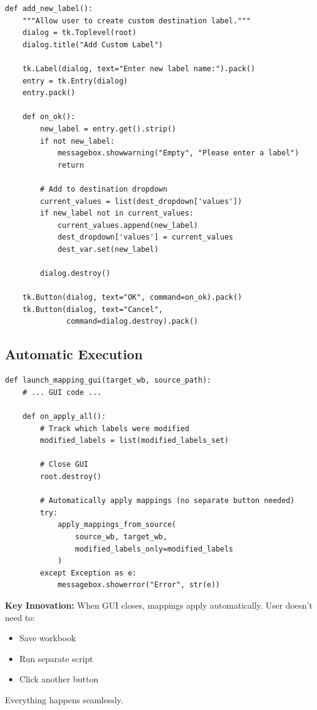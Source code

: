 \begin{lstlisting}[style=pythonstyle]
def add_new_label():
    """Allow user to create custom destination label."""
    dialog = tk.Toplevel(root)
    dialog.title("Add Custom Label")
    
    tk.Label(dialog, text="Enter new label name:").pack()
    entry = tk.Entry(dialog)
    entry.pack()
    
    def on_ok():
        new_label = entry.get().strip()
        if not new_label:
            messagebox.showwarning("Empty", "Please enter a label")
            return
        
        # Add to destination dropdown
        current_values = list(dest_dropdown['values'])
        if new_label not in current_values:
            current_values.append(new_label)
            dest_dropdown['values'] = current_values
            dest_var.set(new_label)
        
        dialog.destroy()
    
    tk.Button(dialog, text="OK", command=on_ok).pack()
    tk.Button(dialog, text="Cancel", 
              command=dialog.destroy).pack()
\end{lstlisting}

\subsection{Automatic Execution}

\begin{lstlisting}[style=pythonstyle]
def launch_mapping_gui(target_wb, source_path):
    # ... GUI code ...
    
    def on_apply_all():
        # Track which labels were modified
        modified_labels = list(modified_labels_set)
        
        # Close GUI
        root.destroy()
        
        # Automatically apply mappings (no separate button needed)
        try:
            apply_mappings_from_source(
                source_wb, target_wb,
                modified_labels_only=modified_labels
            )
        except Exception as e:
            messagebox.showerror("Error", str(e))
\end{lstlisting}

\textbf{Key Innovation:} When GUI closes, mappings apply automatically. User doesn't need to:
\begin{itemize}
    \item Save workbook
    \item Run separate script
    \item Click another button
\end{itemize}

Everything happens seamlessly.
